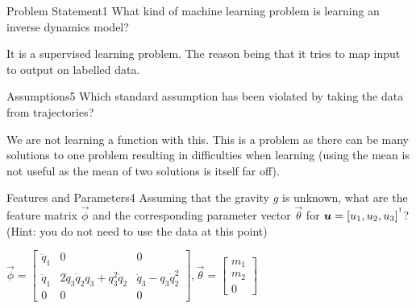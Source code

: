 \begin{questions}


\begin{question}{Problem Statement}{1}
What kind of machine learning problem is learning an inverse dynamics model?

\begin{answer}
	It is a supervised learning problem. The reason being that it tries to map input to output on labelled data.
\end{answer}

\end{question}



\begin{question}{Assumptions}{5}
Which standard assumption has been violated by taking the data from trajectories?

\begin{answer}
	We are not learning a function with this. This is a problem as there can be many solutions to one problem resulting in difficulties when learning (using the mean is not useful as the mean of two solutions is itself far off).
\end{answer}

\end{question}



\begin{question}{Features and Parameters}{4}
Assuming that the gravity $g$ is unknown, what are the feature matrix $\vec{\phi}$ and the corresponding parameter vector $\vec{\theta}$ for ${\boldsymbol{u}}=[u_{1},u_{2},u_{3}]^{^\mathsf{T}}$?
(Hint: you do not need to use the data at this point)

\begin{answer}
$
\vec{\phi}=
\begin{bmatrix}
\ddot{q}_1 & 0 & 0  \\
\ddot{q}_1 & 2\dot{q}_3\dot{q}_2q_3+q_3^2\ddot{q}_2 & \ddot{q}_3-q_3\dot{q}_2^2  \\
0 & 0 & 0 
\end{bmatrix},
\vec{\theta}=
\begin{bmatrix}
m_1  \\
m_2  \\
0  
\end{bmatrix}
$





\end{answer}
\end{question}
\end{questions}
